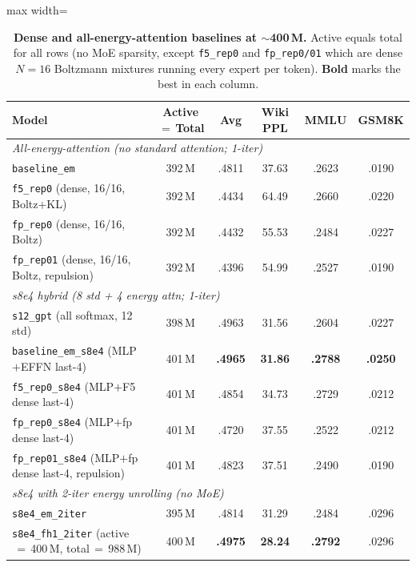 \documentclass[oneside]{article}
\begin{document}
\begin{table}[t]
\centering
\caption{\textbf{Dense and all-energy-attention baselines at $\sim$400\,M.}
Active equals total for all rows (no MoE sparsity, except \texttt{f5\_rep0}
and \texttt{fp\_rep0/01} which are dense $N{=}16$ Boltzmann mixtures
running every expert per token). \textbf{Bold} marks the best in each
column.}
\label{tab:dense}
\begin{adjustbox}{max width=\textwidth}
\begin{tabular}{l|c|cc|cc}
\toprule
\textbf{Model} & \textbf{Active$\,=\,$Total} & \textbf{Avg} & \textbf{Wiki PPL} & \textbf{MMLU} & \textbf{GSM8K} \\
\midrule
\multicolumn{6}{l}{\emph{All-energy-attention (no standard attention; 1-iter)}} \\
\texttt{baseline\_em}                & 392\,M & .4811 & 37.63 & .2623 & .0190 \\
\texttt{f5\_rep0} (dense, 16/16, Boltz+KL) & 392\,M & .4434 & 64.49 & .2660 & .0220 \\
\texttt{fp\_rep0} (dense, 16/16, Boltz)    & 392\,M & .4432 & 55.53 & .2484 & .0227 \\
\texttt{fp\_rep01} (dense, 16/16, Boltz, repulsion) & 392\,M & .4396 & 54.99 & .2527 & .0190 \\
\midrule
\multicolumn{6}{l}{\emph{s8e4 hybrid (8 std + 4 energy attn; 1-iter)}} \\
\texttt{s12\_gpt} (all softmax, 12 std)        & 398\,M & .4963 & 31.56 & .2604 & .0227 \\
\texttt{baseline\_em\_s8e4} (MLP$+$EFFN last-4) & 401\,M & \textbf{.4965} & \textbf{31.86} & \textbf{.2788} & \textbf{.0250} \\
\texttt{f5\_rep0\_s8e4} (MLP$+$F5 dense last-4) & 401\,M & .4854 & 34.73 & .2729 & .0212 \\
\texttt{fp\_rep0\_s8e4} (MLP$+$fp dense last-4) & 401\,M & .4720 & 37.55 & .2522 & .0212 \\
\texttt{fp\_rep01\_s8e4} (MLP$+$fp dense last-4, repulsion) & 401\,M & .4823 & 37.51 & .2490 & .0190 \\
\midrule
\multicolumn{6}{l}{\emph{s8e4 with 2-iter energy unrolling (no MoE)}} \\
\texttt{s8e4\_em\_2iter}                       & 395\,M & .4814 & 31.29 & .2484 & .0296 \\
\texttt{s8e4\_fh1\_2iter} (active$\,=\,$400\,M, total$\,=\,$988\,M) & 400\,M & \textbf{.4975} & \textbf{28.24} & \textbf{.2792} & .0296 \\
\bottomrule
\end{tabular}
\end{adjustbox}
\end{table}
\end{document}
